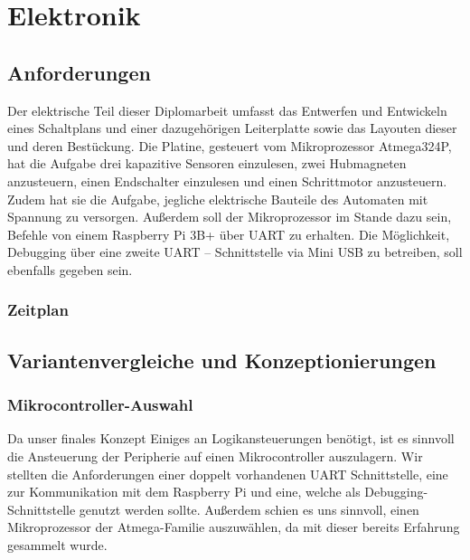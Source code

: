 \chapter{Elektronik}


\section{Anforderungen}

Der elektrische Teil dieser Diplomarbeit umfasst das Entwerfen und Entwickeln eines Schaltplans und einer dazugehörigen Leiterplatte sowie das Layouten dieser und deren Bestückung.
Die Platine, gesteuert vom Mikroprozessor Atmega324P, hat die Aufgabe drei kapazitive Sensoren einzulesen, zwei Hubmagneten anzusteuern, einen Endschalter einzulesen und einen Schrittmotor anzusteuern.
Zudem hat sie die Aufgabe, jegliche elektrische Bauteile des Automaten mit Spannung zu versorgen.
Außerdem soll der Mikroprozessor im Stande dazu sein, Befehle von einem Raspberry Pi 3B+ über UART zu erhalten.
Die Möglichkeit, Debugging über eine zweite UART – Schnittstelle via Mini USB zu betreiben, soll ebenfalls gegeben sein.

\subsection{Zeitplan}

\newpage

\section{Variantenvergleiche und Konzeptionierungen}
\subsection{Mikrocontroller-Auswahl}
Da unser finales Konzept Einiges an Logikansteuerungen benötigt, ist es sinnvoll die Ansteuerung der Peripherie auf einen Mikrocontroller auszulagern.
Wir stellten die Anforderungen einer doppelt vorhandenen UART Schnittstelle, eine zur Kommunikation mit dem Raspberry Pi und eine, welche als Debugging-Schnittstelle genutzt werden sollte.
Außerdem schien es uns sinnvoll, einen Mikroprozessor der Atmega-Familie auszuwählen, da mit dieser bereits Erfahrung gesammelt wurde.
